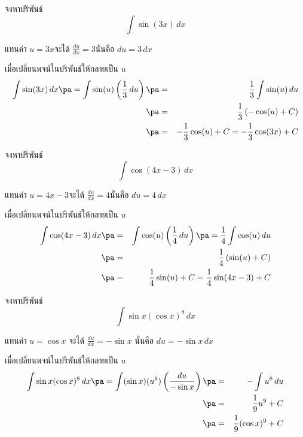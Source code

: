 \begin{frame}[t]
\begin{ex}
จงหาปริพันธ์
\[\int \sin(3x) \,dx\]
\end{ex}
\begin{sol}
แทนค่า $u = 3x$\pa จะได้ $\frac{du}{dx} = 3$\pa นั่นคือ $du = 3\, dx$ \pa

เมื่อเปลี่ยนพจน์ในปริพันธ์ให้กลายเป็น $u$ \pa
\begin{eqnarray*}
\int \sin(3x) \, dx \pa = \int \sin(u) \left( \frac{1}{3} \, du \right) \pa &=& \frac{1}{3} \int \sin(u) \, du \\
\pa &=& \frac{1}{3} \left( -\cos (u) + C \right) \\
\pa &=& -\frac{1}{3} \cos(u) + C = -\frac{1}{3} \cos(3x) + C
\end{eqnarray*}
\end{sol}
\end{frame}


\begin{frame}[t]
\begin{ex}
จงหาปริพันธ์
\[\int \cos(4x-3) \,dx\]
\end{ex}
\begin{sol}
แทนค่า $u = 4x-3$\pa จะได้ $\frac{du}{dx} = 4$\pa นั่นคือ $du = 4\, dx$ \pa

เมื่อเปลี่ยนพจน์ในปริพันธ์ให้กลายเป็น $u$ \pa
\begin{eqnarray*}
\int \cos(4x-3) \, dx \pa &=& \int \cos(u) \left( \frac{1}{4} \, du \right) \pa = \frac{1}{4} \int \cos(u) \, du \\
\pa &=& \frac{1}{4} \left( \sin (u) + C \right) \\
\pa &=& \frac{1}{4} \sin(u) + C = \frac{1}{4} \sin(4x-3) + C
\end{eqnarray*}
\end{sol}
\end{frame}


\begin{frame}[t]
\begin{ex}
จงหาปริพันธ์
\[\int  \sin x (\cos x)^8 \,dx\]
\end{ex}
\begin{sol}
แทนค่า $u = \cos x$ \pa จะได้ $\frac{du}{dx} = - \sin x$ \pa นั่นคือ $du = - \sin x\, dx$

เมื่อเปลี่ยนพจน์ในปริพันธ์ให้กลายเป็น $u$ \pa
\begin{eqnarray*}
\int \sin x (\cos x)^8 \, dx \pa = \int (\sin x) (u^8) \left( \frac{du}{- \sin x} \right) \pa &=& - \int u^8 \, du \\
\pa &=& \frac{1}{9}u^9 + C\\
\pa &=& \frac{1}{9}(\cos x)^9 + C 
\end{eqnarray*}
\end{sol}
\end{frame}

